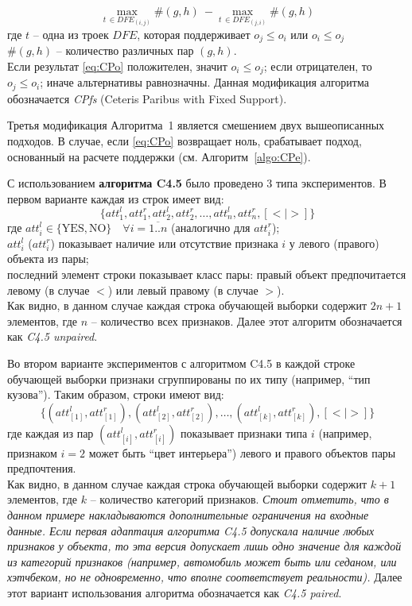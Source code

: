 		\begin{equation}
		\label{eq:CPo}
			\max_{t\, \in DFE_{(i,j)}}\#(g,h) \: - \max_{t\, \in DFE_{(j,i)}}\#(g,h)
		\end{equation}
		где $t$ – одна из троек $DFE$, которая поддерживает $o_j \leq o_i$ или $o_i \leq o_j$\\
		$\#(g,h)$ – количество различных пар $(g,h)$.\\
		Если результат \ref{eq:CPo} положителен, значит $o_i \leq o_j$; если отрицателен, то $o_j \leq o_i$; иначе альтернативы равнозначны. Данная модификация алгоритма обозначается \emph{CPfs} (Ceteris Paribus with Fixed Support).
		
		Третья модификация Алгоритма~1 является смешением двух вышеописанных подходов. В случае, если \ref{eq:CPo} возвращает ноль, срабатывает подход, основанный на расчете поддержки (см. Алгоритм~\ref{algo:CPe}).
		
		С использованием \textbf{алгоритма C4.5} было проведено 3 типа экспериментов. В первом варианте каждая из строк имеет вид: 
		\begin{equation}
		\label{eq:c4.5_unpaired_row}
		\{att_1^l, att_1^r, att_2^l, att_2^r, \dots, att_n^l, att_n^r, [< | >]\}
		\end{equation}
		где $att_i^l \in \{\text{YES}, \text{NO}\} \quad \forall i = \overline{1..n}$ (аналогично для $att_i^r$); \\
		$att_i^l$ ($att_i^r$) показывает наличие или отсутствие признака $i$ у левого (правого) объекта из пары; \\
		последний элемент строки показывает класс пары: правый объект предпочитается левому (в случае $<$) или левый правому (в случае $>$). \\
		Как видно, в данном случае каждая строка обучающей выборки содержит $2n + 1$ элементов, где $n$ – количество всех признаков. Далее этот алгоритм обозначается как \emph{C4.5 unpaired}.
		
		Во втором варианте экспериментов с алгоритмом C4.5 в каждой строке обучающей выборки признаки сгруппированы по их типу (например, ``тип кузова''). Таким образом, строки имеют вид:
		\begin{equation}
		\label{eq:c4.5_paired_row}
		\{(att_{[1]}^l, att_{[1]}^r), (att_{[2]}^l, att_{[2]}^r), \dots, (att_{[k]}^l, att_{[k]}^r), [< | >]\}
		\end{equation}
		где каждая из пар $(att_{[i]}^l, att_{[i]}^r)$ показывает признаки типа $i$ (например, признаком $i=2$ может быть ``цвет интерьера'') левого и правого объектов пары предпочтения. \\
		Как видно, в данном случае каждая строка обучающей выборки содержит $k + 1$ элементов, где $k$ – количество категорий признаков. \emph{Стоит отметить, что в данном примере накладываются дополнительные ограничения на входные данные. Если первая адаптация алгоритма C4.5 допускала наличие любых признаков у объекта, то эта версия допускает лишь одно значение для каждой из категорий признаков (например, автомобиль может быть или седаном, или хэтчбеком, но не одновременно, что вполне соответствует реальности).} Далее этот вариант использования алгоритма обозначается как \emph{C4.5 paired}.
		
